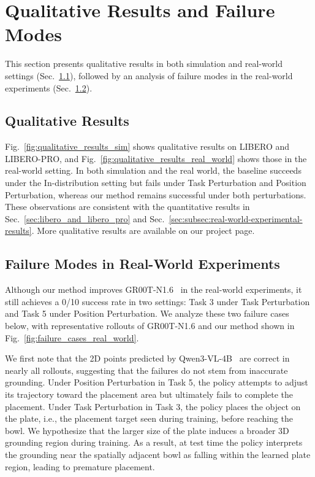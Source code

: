 \section{Qualitative Results and Failure Modes}\label{supp:sec:qualitative_results}
This section presents qualitative results in both simulation and real-world settings (Sec.~\ref{supp:subsec:qualitative_results}), followed by an analysis of failure modes in the real-world experiments (Sec.~\ref{supp:subsec:failure_modes}).

\subsection{Qualitative Results}\label{supp:subsec:qualitative_results}


Fig.~\ref{fig:qualitative_results_sim} shows qualitative results on LIBERO and LIBERO-PRO, and Fig.~\ref{fig:qualitative_results_real_world} shows those in the real-world setting. In both simulation and the real world, the baseline succeeds under the In-distribution setting but fails under Task Perturbation and Position Perturbation, whereas our method remains successful under both perturbations. These observations are consistent with the quantitative results in Sec.~\ref{sec:libero_and_libero_pro} and Sec.~\ref{sec:subsec:real-world-experimental-results}. More qualitative results are available on our project page.

\subsection{Failure Modes in Real-World Experiments}\label{supp:subsec:failure_modes}

Although our method improves GR00T-N1.6~\cite{gr00tn1_2025} in the real-world experiments, it still achieves a 0/10 success rate in two settings: Task 3 under Task Perturbation and Task 5 under Position Perturbation. We analyze these two failure cases below, with representative rollouts of GR00T-N1.6 and our method shown in Fig.~\ref{fig:failure_cases_real_world}.

We first note that the 2D points predicted by Qwen3-VL-4B~\cite{qwen3vl} are correct in nearly all rollouts, suggesting that the failures do not stem from inaccurate grounding. Under Position Perturbation in Task 5, the policy attempts to adjust its trajectory toward the placement area but ultimately fails to complete the placement. Under Task Perturbation in Task 3, the policy places the object on the plate, i.e., the placement target seen during training, before reaching the bowl. We hypothesize that the larger size of the plate induces a broader 3D grounding region during training. As a result, at test time the policy interprets the grounding near the spatially adjacent bowl as falling within the learned plate region, leading to premature placement.